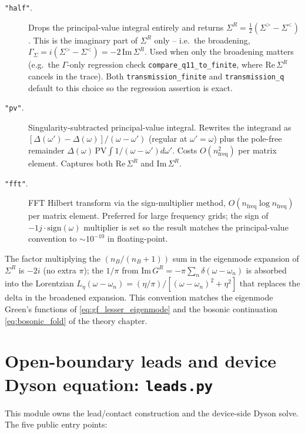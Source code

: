 \begin{description}
  \item[\texttt{"half"}.]  Drops the principal-value integral entirely
        and returns $\Sigma^R = \tfrac{1}{2}(\Sigma^> - \Sigma^<)$.
        This is the imaginary part of $\Sigma^R$ only -- i.e.\ the
        broadening, $\Gamma_\Sigma = i(\Sigma^> - \Sigma^<) = -2\,\mathrm{Im}\,\Sigma^R$.
        Used when only the broadening matters
        (e.g.\ the $\Gamma$-only regression check
        \texttt{compare\_q11\_to\_finite}, where $\mathrm{Re}\,\Sigma^R$
        cancels in the trace).  Both
        \texttt{transmission\_finite} and \texttt{transmission\_q}
        default to this choice so the regression assertion is exact.
  \item[\texttt{"pv"}.]  Singularity-subtracted principal-value
        integral.  Rewrites the integrand as
        $[\Delta(\omega') - \Delta(\omega)]/(\omega-\omega')$
        (regular at $\omega'=\omega$) plus the pole-free remainder
        $\Delta(\omega)\,\mathrm{PV}\!\int 1/(\omega-\omega')d\omega'$.
        Costs $O(n_\mathrm{freq}^2)$ per matrix element.  Captures
        both $\mathrm{Re}\,\Sigma^R$ and $\mathrm{Im}\,\Sigma^R$.
  \item[\texttt{"fft"}.]  FFT Hilbert transform via the
        sign-multiplier method, $O(n_\mathrm{freq}\log n_\mathrm{freq})$
        per matrix element.  Preferred for large frequency grids; the
        sign of $-1j \cdot \mathrm{sign}(\omega)$ multiplier is set so the
        result matches the principal-value convention to $\sim 10^{-10}$
        in floating-point.
\end{description}

\noindent
The factor multiplying the
$(n_B/(n_B+1))$ sum in the eigenmode expansion of $\Sigma^R$ is
$-2i$ (no extra $\pi$); the $1/\pi$ from
$\mathrm{Im}\,G^R = -\pi\sum_n\delta(\omega-\omega_n)$ is absorbed
into the Lorentzian
$L_\eta(\omega-\omega_n) = (\eta/\pi)/[(\omega-\omega_n)^2+\eta^2]$
that replaces the delta in the broadened expansion.  This convention
matches the eigenmode Green's functions of \cref{eq:gf_lesser_eigenmode}
and the bosonic continuation \cref{eq:bosonic_fold} of the theory
chapter.

\section{Open-boundary leads and device Dyson equation: \texttt{leads.py}}
\label{sec:solver_leads}

This module owns the lead/contact construction and the
device-side Dyson solve.  The five public entry points:

